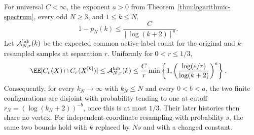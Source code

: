 \documentclass[11pt,letterpaper]{article}
\begin{document}
\begin{theorem}
\label{thm:finite-logarithmic-noise}
For universal $C<\infty$, the exponent $a>0$ from
Theorem~\ref{thm:logarithmic-spectrum}, every odd $N\ge3$, and
$1\le k\le N$,
\begin{equation}\label{eq:finite-log-noise}
 1-p_N(k)\le\frac{C}{[\log(k+2)]^a}.
\end{equation}
Let $\mathcal A^{\rm lab}_{N,r}(k)$ be the expected common
active-label count for the original and $k$-resampled samples at
separation $r$. Uniformly for $0<r\le1/3$,
\begin{equation}\label{eq:finite-log-overlap}
 \EE|C_r(X)\cap C_r(X^{[k]})|
 \le\mathcal A^{\rm lab}_{N,r}(k)
 \le\frac Cr\min\left\{1,
       \left(\frac{\log(e/r)}{\log(k+2)}\right)^a\right\}.
\end{equation}
Consequently, for every $k_N\to\infty$ with $k_N\le N$ and every
$0<b<a$, the two finite configurations are disjoint with probability
tending to one at cutoff
$r_N=(\log(k_N+2))^{-b}$, once this is at most $1/3$.
Their later histories then share no vertex.
For independent-coordinate resampling with probability $s$, the same
two bounds hold with $k$ replaced by $Ns$ and with a changed constant.
\end{theorem}
\end{document}
